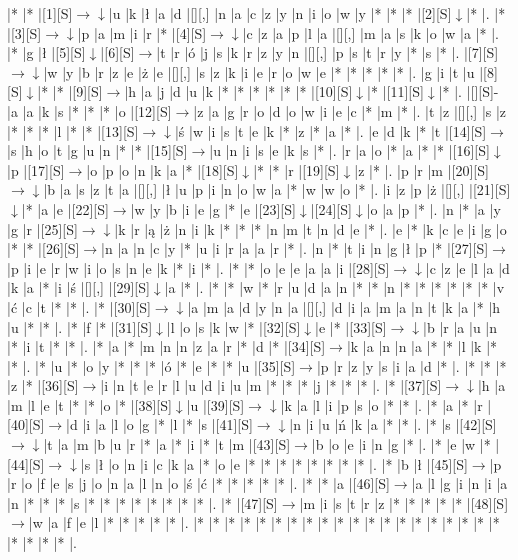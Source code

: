 \documentclass[11pt]{article}
\newcommand\drarr{$\rightarrow \!\!\!\!\! \downarrow$}
\newcommand\rarr{$\rightarrow$}
\newcommand\darr{$\downarrow$}
\begin{document}
\noindent\begin{Puzzle}{23}{28}|*	|*	|[1][S]\drarr	|u	|k	|ł	|a	|d	|[][,]{ }	|n	|a	|c	|z	|y	|n	|i	|o	|w	|y	|*	|*	|*	|[2][S]\darr	|*	|.
|*	|[3][S]\drarr	|p	|a	|m	|i	|r	|*	|[4][S]\drarr	|c	|z	|a	|p	|l	|a	|[][,]{ }	|m	|a	|s	|k	|o	|w	|a	|*	|.
|*	|g	|ł	|[5][S]\darr	|[6][S]\rarr	|t	|r	|ó	|j	|s	|k	|r	|z	|y	|n	|[][,]{ }	|p	|s	|t	|r	|y	|*	|s	|*	|.
|[7][S]\drarr	|w	|y	|b	|r	|z	|e	|ż	|e	|[][,]{ }	|s	|z	|k	|i	|e	|r	|o	|w	|e	|*	|*	|*	|*	|*	|.
|g	|i	|t	|u	|[8][S]\darr	|*	|*	|[9][S]\rarr	|h	|a	|j	|d	|u	|k	|*	|*	|*	|*	|*	|*	|[10][S]\darr	|*	|[11][S]\darr	|*	|.
|[][S]-	|a	|a	|k	|s	|*	|*	|*	|o	|[12][S]\rarr	|z	|a	|g	|r	|o	|d	|o	|w	|i	|e	|c	|*	|m	|*	|.
|t	|z	|[][,]{ }	|s	|z	|*	|*	|*	|l	|*	|*	|[13][S]\drarr	|ś	|w	|i	|s	|t	|e	|k	|*	|z	|*	|a	|*	|.
|e	|d	|k	|*	|t	|[14][S]\rarr	|s	|h	|o	|t	|g	|u	|n	|*	|*	|[15][S]\rarr	|u	|n	|i	|s	|e	|k	|s	|*	|.
|r	|a	|o	|*	|a	|*	|*	|[16][S]\darr	|p	|[17][S]\rarr	|o	|p	|o	|n	|k	|a	|*	|[18][S]\darr	|*	|*	|r	|[19][S]\darr	|z	|*	|.
|p	|r	|m	|[20][S]\drarr	|b	|a	|s	|z	|t	|a	|[][,]{ }	|ł	|u	|p	|i	|n	|o	|w	|a	|*	|w	|w	|o	|*	|.
|i	|z	|p	|ż	|[][,]{ }	|[21][S]\darr	|*	|a	|e	|[22][S]\rarr	|w	|y	|b	|i	|e	|g	|*	|e	|[23][S]\darr	|[24][S]\darr	|o	|a	|p	|*	|.
|n	|*	|a	|y	|g	|r	|[25][S]\drarr	|k	|r	|ą	|ż	|n	|i	|k	|*	|*	|*	|n	|m	|t	|n	|d	|e	|*	|.
|e	|*	|k	|c	|e	|i	|g	|o	|*	|*	|[26][S]\rarr	|n	|a	|n	|c	|y	|*	|u	|i	|r	|a	|a	|r	|*	|.
|n	|*	|t	|i	|n	|g	|ł	|p	|*	|[27][S]\rarr	|p	|i	|e	|r	|w	|i	|o	|s	|n	|e	|k	|*	|i	|*	|.
|*	|*	|o	|e	|e	|a	|a	|i	|[28][S]\drarr	|c	|z	|e	|l	|a	|d	|k	|a	|*	|i	|ś	|[][,]{ }	|[29][S]\darr	|a	|*	|.
|*	|*	|w	|*	|r	|u	|d	|a	|n	|*	|*	|n	|*	|*	|*	|*	|*	|*	|v	|ć	|c	|t	|*	|*	|.
|*	|[30][S]\drarr	|a	|m	|a	|d	|y	|n	|a	|[][,]{ }	|d	|i	|a	|m	|a	|n	|t	|k	|a	|*	|h	|u	|*	|*	|.
|*	|f	|*	|[31][S]\darr	|l	|o	|s	|k	|w	|*	|[32][S]\darr	|e	|*	|[33][S]\drarr	|b	|r	|a	|u	|n	|*	|i	|t	|*	|*	|.
|*	|a	|*	|m	|n	|n	|z	|a	|r	|*	|d	|*	|[34][S]\rarr	|k	|a	|n	|n	|a	|*	|*	|l	|k	|*	|*	|.
|*	|u	|*	|o	|y	|*	|*	|*	|ó	|*	|e	|*	|*	|u	|[35][S]\rarr	|p	|r	|z	|y	|s	|i	|a	|d	|*	|.
|*	|*	|*	|z	|*	|[36][S]\rarr	|i	|n	|t	|e	|r	|l	|u	|d	|i	|u	|m	|*	|*	|*	|j	|*	|*	|*	|.
|*	|[37][S]\drarr	|h	|a	|m	|l	|e	|t	|*	|*	|o	|*	|[38][S]\darr	|u	|[39][S]\drarr	|k	|a	|l	|i	|p	|s	|o	|*	|*	|.
|*	|a	|*	|r	|[40][S]\rarr	|d	|i	|a	|l	|o	|g	|*	|l	|*	|s	|[41][S]\drarr	|n	|i	|u	|ń	|k	|a	|*	|*	|.
|*	|s	|[42][S]\drarr	|t	|a	|m	|b	|u	|r	|*	|a	|*	|i	|*	|t	|m	|[43][S]\rarr	|b	|o	|e	|i	|n	|g	|*	|.
|*	|e	|w	|*	|[44][S]\drarr	|s	|ł	|o	|n	|i	|c	|k	|a	|*	|o	|e	|*	|*	|*	|*	|*	|*	|*	|*	|.
|*	|b	|ł	|[45][S]\rarr	|p	|r	|o	|f	|e	|s	|j	|o	|n	|a	|l	|n	|o	|ś	|ć	|*	|*	|*	|*	|*	|.
|*	|*	|a	|[46][S]\rarr	|a	|l	|g	|i	|n	|i	|a	|n	|*	|*	|*	|s	|*	|*	|*	|*	|*	|*	|*	|*	|.
|*	|[47][S]\rarr	|m	|i	|s	|t	|r	|z	|*	|*	|*	|*	|*	|[48][S]\rarr	|w	|a	|f	|e	|l	|*	|*	|*	|*	|*	|.
|*	|*	|*	|*	|*	|*	|*	|*	|*	|*	|*	|*	|*	|*	|*	|*	|*	|*	|*	|*	|*	|*	|*	|*	|.\end{Puzzle}
\end{document}
